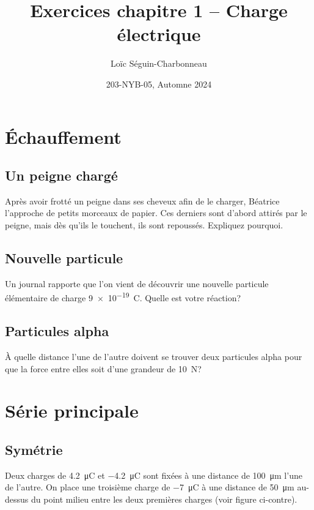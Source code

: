 \documentclass[nofonts]{tufte-handout}
\title{Exercices chapitre 1 -- Charge électrique}
\author{Loïc Séguin-Charbonneau}
\date{203-NYB-05, Automne 2024}
\begin{document}
\maketitle

\section{Échauffement}

\subsection{Un peigne chargé}

Après avoir frotté un peigne dans ses cheveux afin de le charger, Béatrice
l'approche de petits morceaux de papier. Ces derniers sont d'abord attirés par
le peigne, mais dès qu'ils le touchent, ils sont repoussés. Expliquez pourquoi.

\subsection{Nouvelle particule}

Un journal rapporte que l'on vient de découvrir une nouvelle particule
élémentaire de charge \SI{9e-19}{\coulomb}. Quelle est votre réaction?


\subsection{Particules alpha}

À quelle distance l'une de l'autre doivent se trouver deux particules alpha pour
que la force entre elles soit d'une grandeur de \qty{10}{\newton}?


\section{Série principale}

\subsection{Symétrie}

Deux charges de \qty{4.2}{\micro\coulomb} et \qty{-4.2}{\micro\coulomb} sont
fixées à une distance de \qty{100}{\micro\meter} l'une de l'autre. On place une
troisième charge de \qty{-7}{\micro\coulomb} à une distance de
\qty{50}{\micro\meter} au-dessus du point milieu entre les deux premières
charges (voir figure ci-contre).
\begin{marginfigure}
\end{marginfigure}
\end{document}
